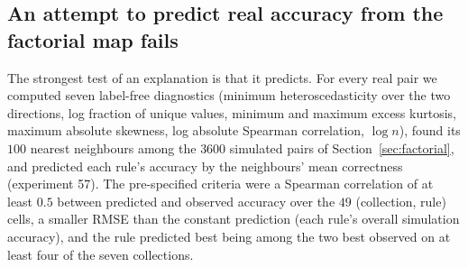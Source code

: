 \subsection{An attempt to predict real accuracy from the factorial map fails}\label{sec:predict}
The strongest test of an explanation is that it predicts. For every real pair we computed seven label-free diagnostics (minimum heteroscedasticity over the two directions, log fraction of unique values, minimum and maximum excess kurtosis, maximum absolute skewness, log absolute Spearman correlation, $\log n$), found its $100$ nearest neighbours among the $3600$ simulated pairs of Section~\ref{sec:factorial}, and predicted each rule's accuracy by the neighbours' mean correctness (experiment 57). The pre-specified criteria were a Spearman correlation of at least $0.5$ between predicted and observed accuracy over the $49$ (collection, rule) cells, a smaller RMSE than the constant prediction (each rule's overall simulation accuracy), and the rule predicted best being among the two best observed on at least four of the seven collections.

